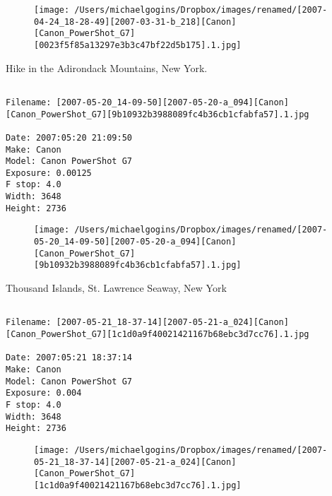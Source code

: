 \begin{figure}
\texttt{[image: /Users/michaelgogins/Dropbox/images/renamed/[2007-04-24\_18-28-49][2007-03-31-b\_218][Canon][Canon\_PowerShot\_G7][0023f5f85a13297e3b3c47bf22d5b175].1.jpg]}
\end{figure}
    
\clearpage
\onecolumn
\noindent Hike in the Adirondack Mountains, New York.
\noindent
\begin{lstlisting}

Filename: [2007-05-20_14-09-50][2007-05-20-a_094][Canon][Canon_PowerShot_G7][9b10932b3988089fc4b36cb1cfabfa57].1.jpg

Date: 2007:05:20 21:09:50
Make: Canon
Model: Canon PowerShot G7
Exposure: 0.00125
F stop: 4.0
Width: 3648
Height: 2736
\end{lstlisting}
\clearpage

\begin{figure}
\texttt{[image: /Users/michaelgogins/Dropbox/images/renamed/[2007-05-20\_14-09-50][2007-05-20-a\_094][Canon][Canon\_PowerShot\_G7][9b10932b3988089fc4b36cb1cfabfa57].1.jpg]}
\end{figure}
    
\clearpage
\onecolumn
\noindent Thousand Islands, St. Lawrence Seaway, New York
\noindent
\begin{lstlisting}

Filename: [2007-05-21_18-37-14][2007-05-21-a_024][Canon][Canon_PowerShot_G7][1c1d0a9f40021421167b68ebc3d7cc76].1.jpg

Date: 2007:05:21 18:37:14
Make: Canon
Model: Canon PowerShot G7
Exposure: 0.004
F stop: 4.0
Width: 3648
Height: 2736
\end{lstlisting}
\clearpage

\begin{figure}
\texttt{[image: /Users/michaelgogins/Dropbox/images/renamed/[2007-05-21\_18-37-14][2007-05-21-a\_024][Canon][Canon\_PowerShot\_G7][1c1d0a9f40021421167b68ebc3d7cc76].1.jpg]}
\end{figure}
    
